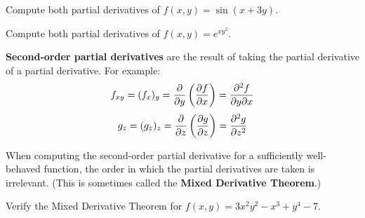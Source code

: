 \documentclass[letterpaper, twoside, 12pt]{book}
\begin{document}
          \begin{solution}

          \end{solution}

          \begin{problem}
            Compute both partial derivatives of $f(x,y)=\sin(x+3y)$.
          \end{problem}

          \begin{solution}

          \end{solution}

          \begin{problem}
            Compute both partial derivatives of $f(x,y)=e^{xy^2}$.
          \end{problem}

          \begin{solution}

          \end{solution}

\begin{definition}
  \textbf{Second-order partial derivatives} are the result of taking the
  partial derivative of a partial derivative. For example:
  \[
    f_{xy} =
    (f_x)_y =
    \frac{\partial}{\partial y}\left(\frac{\partial f}{\partial x}\right) =
    \frac{\partial^2 f}{\partial y\partial x}
  \]
  \[
    g_{z} =
    (g_z)_z =
    \frac{\partial}{\partial z}\left(\frac{\partial g}{\partial z}\right) =
    \frac{\partial^2 g}{\partial z^2}
  \]
\end{definition}

\begin{theorem}
  When computing the second-order partial derivative for a sufficiently
  well-behaved function, the order in which the partial
  derivatives are taken is irrelevant. (This is sometimes called the
  \textbf{Mixed Derivative Theorem}.)
\end{theorem}

          \begin{problem}
            Verify the Mixed Derivative Theorem for
            $f(x,y)=3x^2y^2-x^3+y^4-7$.
          \end{problem}

          \begin{solution}

          \end{solution}
\end{document}
